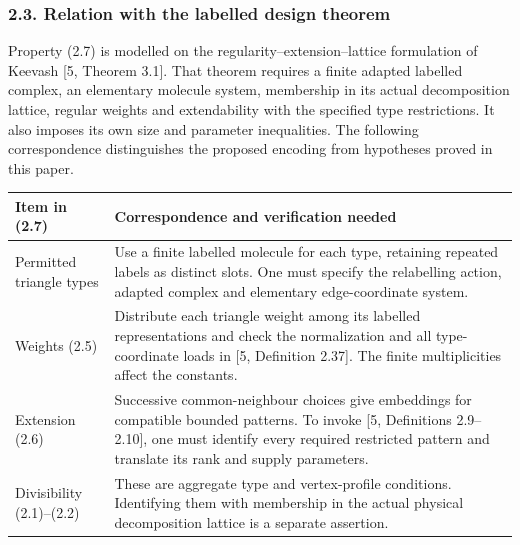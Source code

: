 \documentclass[english,11pt,a4paper]{article}
\begin{document}
\subsubsection{2.3. Relation with the labelled design theorem}\label{relation-with-the-labelled-design-theorem}

Property (2.7) is modelled on the regularity--extension--lattice formulation of Keevash {[}5, Theorem 3.1{]}. That theorem requires a finite adapted labelled complex, an elementary molecule system, membership in its actual decomposition lattice, regular weights and extendability with the specified type restrictions. It also imposes its own size and parameter inequalities. The following correspondence distinguishes the proposed encoding from hypotheses proved in this paper.

{\begin{longtable}[]{@{}
  >{\raggedright\arraybackslash}p{}
  >{\raggedright\arraybackslash}p{}@{}}
\toprule\noalign{}
\begin{minipage}[b]{\linewidth}\raggedright
Item in (2.7)
\end{minipage} & \begin{minipage}[b]{\linewidth}\raggedright
Correspondence and verification needed
\end{minipage} \\
\midrule\noalign{}
\endhead
\bottomrule\noalign{}
\endlastfoot
Permitted triangle types & Use a finite labelled molecule for each type, retaining repeated labels as distinct slots. One must specify the relabelling action, adapted complex and elementary edge-coordinate system. \\
Weights (2.5) & Distribute each triangle weight among its labelled representations and check the normalization and all type-coordinate loads in {[}5, Definition 2.37{]}. The finite multiplicities affect the constants. \\
Extension (2.6) & Successive common-neighbour choices give embeddings for compatible bounded patterns. To invoke {[}5, Definitions 2.9--2.10{]}, one must identify every required restricted pattern and translate its rank and supply parameters. \\
Divisibility (2.1)--(2.2) & These are aggregate type and vertex-profile conditions. Identifying them with membership in the actual physical decomposition lattice is a separate assertion. \\
\end{longtable}
}
\end{document}
